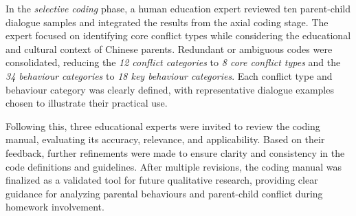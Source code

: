 
In the \textit{selective coding} phase, a human education expert reviewed ten parent-child dialogue samples and integrated the results from the axial coding stage. The expert focused on identifying core conflict types while considering the educational and cultural context of Chinese parents. Redundant or ambiguous codes were consolidated, reducing the \textit{12 conflict categories} to \textit{8 core conflict types} and the \textit{34 behaviour categories} to \textit{18 key behaviour categories}. Each conflict type and behaviour category was clearly defined, with representative dialogue examples chosen to illustrate their practical use.

Following this, three educational experts were invited to review the coding manual, evaluating its accuracy, relevance, and applicability. Based on their feedback, further refinements were made to ensure clarity and consistency in the code definitions and guidelines. After multiple revisions, the coding manual was finalized as a validated tool for future qualitative research, providing clear guidance for analyzing parental behaviours and parent-child conflict during homework involvement.



